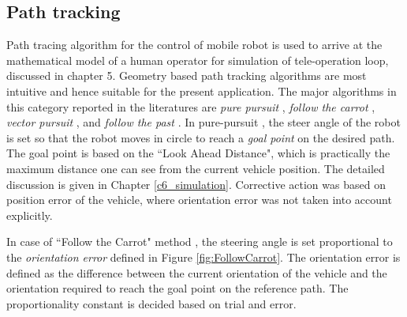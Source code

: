 \subsection{Path tracking}
Path tracing algorithm for the control of  mobile robot is used to arrive at the mathematical model of a human operator for simulation of tele-operation loop, discussed in chapter 5. Geometry based path tracking algorithms are most intuitive and hence suitable for the present application. The major algorithms in this  category reported in the literatures are \textit{pure pursuit} \cite{coulter1992implementation}, \textit{follow the carrot} \cite{barton2001controller}, \textit{vector pursuit} \cite{wit2004autonomous}, and \textit{follow the past} \cite{hellstrom2006follow}. In pure-pursuit \cite{coulter1992implementation}, the steer angle of the robot is set so that the robot moves in circle to reach a \textit{ goal point} on the desired path. The goal point is based on the ``Look Ahead Distance", which is practically the maximum distance one can see from the current vehicle position. The detailed discussion is given in Chapter \ref{c6_simulation}.  Corrective action was based on  position error of the vehicle, where orientation error was not taken into account explicitly. 

In case of ``Follow the Carrot" method \cite{barton2001controller},  the steering angle is set proportional to the \textit{orientation error} defined in Figure \ref{fig:FollowCarrot}. The orientation error is defined as the difference between the current orientation of the vehicle and the orientation required to reach the goal point on the reference path.  The proportionality constant is decided based on trial and error.

